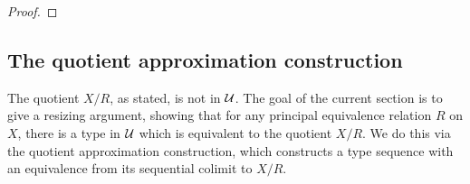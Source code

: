 \begin{proof}
\begin{comment}
The fiber of $\varphi$ at a pair $\pairr{g,K}$ consisting of a map $g:Y\to X/R$ and a homotopy $K: g\circ\pi_2\htpy q_X\circ \pi_2$ for which the square in \autoref{eq:classifier} is a pullback, is equivalent to the type
\begin{align*}
\sm{\gamma:\prd{y:Y}\mathcal{O}_R(S(y))} \pairr{g,K}=\pairr{S,\gamma,H^\gamma}
\end{align*}
This type is equivalent to
\begin{equation*}
\sm{\gamma:\prd{y:Y}\mathcal{O}_R(S(y))}{\alpha:\pi_1\circ g=S}{\beta:\trans{\alpha}{\pi_2\circ g}=\gamma} \trans{\pairr{\alpha,\beta}}{K}=H^\gamma.
\end{equation*}
Since $\gamma$ appears free on one side of an equality, this type is equivalent to the type
\begin{equation*}
\sm{\alpha:\pi_1\circ g=S} \trans{\alpha}{K}=H^{\trans{\alpha}{\pi_2\circ g}}.
\end{equation*}
This is equivalent to the type
\begin{equation*}
\pairr{\pi_1\circ g,K}=
\end{equation*}
This is an identity type in the fiber 
By type theoretic choice, this type is equivalent to the type
\begin{align*}
\prd{y:Y}\sm{\gamma(y):\mathcal{O}_R(S(y))} \pairr{S(y),\gamma(y)}=g(y)
\end{align*}
By the pullback square of \autoref{eq:classifier}, it follows that $\pi_1\circ g:Y\to \im(R)$ is equal to $S$. By transporting $\pi_2(g(y))$ along this equality, we see that the type $\pairr{S(y),\gamma(y)}=g(y)$ is equivalent to the type $\pairr{S(y),\gamma(y)}=\pairr{S(y),\beta(y)}$ for some orientation $\beta(y):\mathcal{O}_R(S(y))$. Hence we see that the fiber is contractible.
\end{comment}
\end{proof}

\subsection{The quotient approximation construction}

The quotient $X/R$, as stated, is not in $\mathcal{U}$. The goal of the current section is to give a resizing argument, showing that for any principal equivalence relation $R$ on $X$, there is a type in $\mathcal{U}$ which is equivalent to the quotient $X/R$. We do this via the quotient approximation construction, which constructs a type sequence with an equivalence from its sequential colimit to $X/R$.

